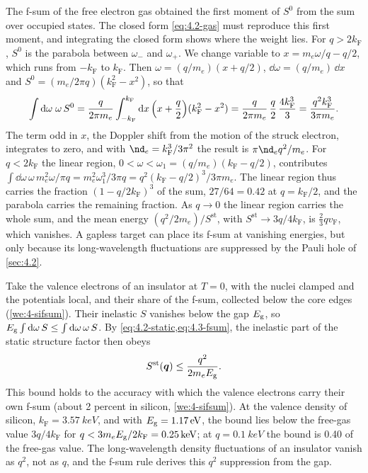 \begin{workedexample}{The f-sum of the free electron gas}\label{we:4-gasfsum}
 obtained the first moment of $S^0$ from the sum over occupied states. The closed form \cref{eq:4.2-gas} must reproduce this first moment, and integrating the closed form shows where the weight lies. For $q > 2k_{\mathrm{F}}$, $S^0$ is the parabola between $\omega_-$ and $\omega_+$. We change variable to $x = m_e\omega/q - q/2$, which runs from $-k_{\mathrm{F}}$ to $k_{\mathrm{F}}$. Then $\omega = (q/m_e)(x + q/2)$, $\dd\omega = (q/m_e)\,\dd x$ and $S^0 = (m_e/2\pi q)(k_{\mathrm{F}}^2 - x^2)$, so that
\begin{equation*}
  \int\mathrm{d}\omega\;\omega\,S^0 = \frac{q}{2\pi m_e}\int_{-k_{\mathrm{F}}}^{k_{\mathrm{F}}}\mathrm{d} x\,\Bigl(x + \frac q2\Bigr)(k_{\mathrm{F}}^2 - x^2) = \frac{q}{2\pi m_e}\,\frac q2\,\frac{4k_{\mathrm{F}}^3}{3} = \frac{q^2k_{\mathrm{F}}^3}{3\pi m_e} .
\end{equation*}
The term odd in $x$, the Doppler shift from the motion of the struck electron, integrates to zero, and with $\nd_e = k_{\mathrm{F}}^3/3\pi^2$ the result is $\pi\nd_eq^2/m_e$. For $q < 2k_{\mathrm{F}}$ the linear region, $0 < \omega < \omega_1 = (q/m_e)(k_{\mathrm{F}} - q/2)$, contributes $\int\dd\omega\,\omega\,m_e^2\omega/\pi q = m_e^2\omega_1^3/3\pi q = q^2(k_{\mathrm{F}} - q/2)^3/3\pi m_e$. The linear region thus carries the fraction $(1 - q/2k_{\mathrm{F}})^3$ of the sum, $27/64 = 0.42$ at $q = k_{\mathrm{F}}/2$, and the parabola carries the remaining fraction. As $q \to 0$ the linear region carries the whole sum, and the mean energy $(q^2/2m_e)/S^{\mathrm{st}}$, with $S^{\mathrm{st}} \to 3q/4k_{\mathrm{F}}$, is $\tfrac23qv_{\mathrm{F}}$, which vanishes. A gapless target can place its f-sum at vanishing energies, but only because its long-wavelength fluctuations are suppressed by the Pauli hole of \cref{sec:4.2}.

Take the valence electrons of an insulator at $T = 0$, with the nuclei clamped and the potentials local, and their share of the f-sum, collected below the core edges (\cref{we:4-sifsum}). Their inelastic $S$ vanishes below the gap $E_{\mathrm{g}}$, so $E_{\mathrm{g}}\int\mathrm{d}\omega\,S \le \int\mathrm{d}\omega\,\omega\,S$. By \cref{eq:4.2-static,eq:4.3-fsum}, the inelastic part of the static structure factor then obeys
\begin{equation*}
  S^{\mathrm{st}}(\bm{q}) \le \frac{q^2}{2m_eE_{\mathrm{g}}} .
\end{equation*}
This bound holds to the accuracy with which the valence electrons carry their own f-sum (about 2 percent in silicon, \cref{we:4-sifsum}). At the valence density of silicon, $k_{\mathrm{F}} = \SI{3.57}{keV}$, and with $E_{\mathrm{g}} = \SI{1.17}{eV}$, the bound lies below the free-gas value $3q/4k_{\mathrm{F}}$ for $q < 3m_eE_{\mathrm{g}}/2k_{\mathrm{F}} = \SI{0.25}{keV}$; at $q = \SI{0.1}{keV}$ the bound is 0.40 of the free-gas value. The long-wavelength density fluctuations of an insulator vanish as $q^2$, not as $q$, and the f-sum rule derives this $q^2$ suppression from the gap.
\end{workedexample}

